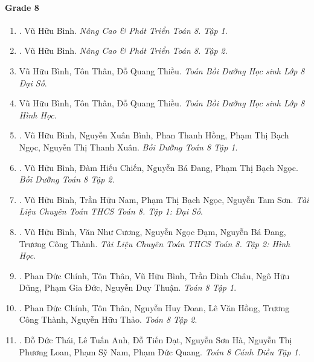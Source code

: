 \documentclass{article}
\begin{document}
\paragraph{Grade 8}

\begin{enumerate}
	\item \cite{Binh_Toan_8_tap_1}. Vũ Hữu Bình. {\it Nâng Cao \& Phát Triển Toán 8. Tập 1}.\hfill{\sf[reading]}

	\item \cite{Binh_Toan_8_tap_2}. Vũ Hữu Bình. {\it Nâng Cao \& Phát Triển Toán 8. Tập 2}.\hfill{\sf[reading]}

	\item Vũ Hữu Bình, Tôn Thân, Đỗ Quang Thiều. {\it Toán Bồi Dưỡng Học sinh Lớp 8 Đại Số}.

	\item Vũ Hữu Bình, Tôn Thân, Đỗ Quang Thiều. {\it Toán Bồi Dưỡng Học sinh Lớp 8 Hình Học}.

	\item \cite{Binh_boi_duong_Toan_8_tap_1}. Vũ Hữu Bình, Nguyễn Xuân Bình, Phan Thanh Hồng, Phạm Thị Bạch Ngọc, Nguyễn Thị Thanh Xuân. {\it Bồi Dưỡng Toán 8 Tập 1}.\hfill{\sf[reading]}

	\item \cite{Binh_boi_duong_Toan_8_tap_2}. Vũ Hữu Bình, Đàm Hiếu Chiến, Nguyễn Bá Đang, Phạm Thị Bạch Ngọc. {\it Bồi Dưỡng Toán 8 Tập 2}.\hfill{\sf[reading]}

	\item \cite{TLCT_THCS_Toan_8_dai_so}. Vũ Hữu Bình, Trần Hữu Nam, Phạm Thị Bạch Ngọc, Nguyễn Tam Sơn. {\it Tài Liệu Chuyên Toán THCS Toán 8. Tập 1: Đại Số}.\hfill{\sf[reading]}

	\item \cite{TLCT_THCS_Toan_8_hinh_hoc}. Vũ Hữu Bình, Văn Như Cương, Nguyễn Ngọc Đạm, Nguyễn Bá Đang, Trương Công Thành. {\it Tài Liệu Chuyên Toán THCS Toán 8. Tập 2: Hình Học}.\hfill{\sf[reading]}

	\item \cite{SGK_Toan_8_tap_1}. Phan Đức Chính, Tôn Thân, Vũ Hữu Bình, Trần Đình Châu, Ngô Hữu Dũng, Phạm Gia Đức, Nguyễn Duy
	Thuận. {\it Toán 8 Tập 1}.\hfill{\sf[done]}

	\item \cite{SGK_Toan_8_tap_2}. Phan Đức Chính, Tôn Thân, Nguyễn Huy Đoan, Lê Văn Hồng, Trương Công Thành, Nguyễn Hữu Thảo. {\it Toán 8 Tập 2}.\hfill{\sf[done]}

	\item \cite{SGK_Toan_8_CD_tap_1}. Đỗ Đức Thái, Lê Tuấn Anh, Đỗ Tiến Đạt, Nguyễn Sơn Hà, Nguyễn Thị Phương Loan, Phạm Sỹ Nam, Phạm Đức Quang. {\it Toán 8 Cánh Diều Tập 1}.\hfill{\sf[reading]}


\end{enumerate}
\end{document}
